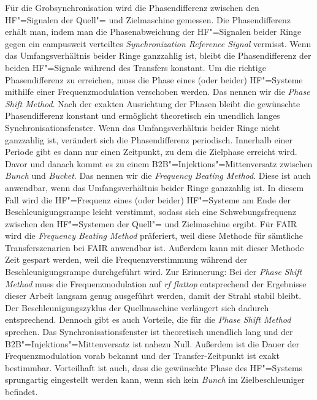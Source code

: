 F\"ur die Grobsynchronisation wird die Phasendifferenz zwischen den HF"=Signalen der Quell"= und Zielmaschine gemessen. Die Phasendifferenz erhält man, indem man die Phasenabweichung der HF"=Signalen beider Ringe gegen ein campusweit verteiltes \textit{Synchronization Reference Signal} vermisst. Wenn das Umfangsverh\"altnis  beider Ringe ganzzahlig ist, bleibt die Phasendifferenz der beiden HF"=Signale w\"ahrend des Transfers konstant. Um die richtige Phasendifferenz zu erreichen, muss die Phase eines (oder beider) HF"=Systeme mithilfe einer Frequenzmodulation verschoben werden. Das nennen wir die \textit{Phase Shift Method}. Nach der exakten Ausrichtung der Phasen bleibt die gew\"unschte Phasendifferenz konstant und erm\"oglicht theoretisch ein unendlich langes Synchronisationsfenster. Wenn das Umfangsverh\"altnis beider Ringe nicht ganzzahlig ist, ver\"andert sich die Phasendifferenz periodisch. Innerhalb einer Periode gibt es dann nur einen Zeitpunkt, zu dem die Zielphase erreicht wird. Davor und danach kommt es zu einem B2B"=Injektions"=Mittenversatz zwischen \textit{Bunch} und \textit{Bucket}. Das nennen wir die \textit{Frequency Beating Method}. Diese ist auch anwendbar, wenn das Umfangsverh\"altnis beider Ringe ganzzahlig ist. In diesem Fall wird die HF"=Frequenz eines (oder beider) HF"=Systeme am Ende der Beschleunigungsrampe leicht verstimmt, sodass sich eine Schwebungsfrequenz zwischen den HF"=Systemen der Quell"= und Zielmaschine ergibt. F\"ur FAIR wird die \textit{Frequency Beating Method} pr\"aferiert, weil diese Methode f\"ur s\"amtliche Transferszenarien bei FAIR anwendbar ist. Au\ss{}erdem kann mit dieser Methode Zeit gespart werden, weil die Frequenzverstimmung w\"ahrend der Beschleunigungsrampe durchgef\"uhrt wird. Zur Erinnerung: Bei der \textit{Phase Shift Method} muss die Frequenzmodulation auf \textit{rf flattop} entsprechend der Ergebnisse dieser Arbeit langsam genug ausgef\"uhrt werden, damit der Strahl stabil bleibt. Der Beschleunigungszyklus der Quellmaschine verlängert sich dadurch entsprechend. Dennoch gibt es auch Vorteile, die f\"ur die \textit{Phase Shift Method} sprechen. Das Synchronisationsfenster ist theoretisch unendlich lang und der B2B"=Injektions"=Mittenversatz ist nahezu Null. Au\ss{}erdem ist die Dauer der Frequenzmodulation vorab bekannt und der Transfer-Zeitpunkt ist exakt bestimmbar. Vorteilhaft ist auch, dass die gew\"unschte Phase des HF"=Systems  sprungartig eingestellt werden kann, wenn sich kein \textit{Bunch} im Zielbeschleuniger befindet.

